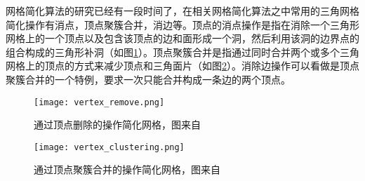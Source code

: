 网格简化算法的研究已经有一段时间了，在相关网格简化算法之中常用的三角网格简化操作有消点，顶点聚簇合并，消边等。顶点的消点操作是指在消除一个三角形网格上的一个顶点以及包含该顶点的边和面形成一个洞，然后利用该洞的边界点的组合构成的三角形补洞（如图\ref{fig:rm-vertex}）。顶点聚簇合并是指通过同时合并两个或多个三角网格上的顶点的方式来减少顶点和三角面片（如图\ref{fig:clu-vertex}）。消除边操作可以看做是顶点聚簇合并的一个特例，要求一次只能合并构成一条边的两个顶点。
\begin{figure}[htbp]
    \centering
    \texttt{[image: vertex\_remove.png]}
    \caption{通过顶点删除的操作简化网格，图来自\cite{mesh-simp}}
    \label{fig:rm-vertex}
\end{figure}
\begin{figure}[htbp]
    \centering
    \texttt{[image: vertex\_clustering.png]}
    \caption{通过顶点聚簇合并的操作简化网格，图来自\cite{mesh-simp}}
    \label{fig:clu-vertex}
\end{figure}

